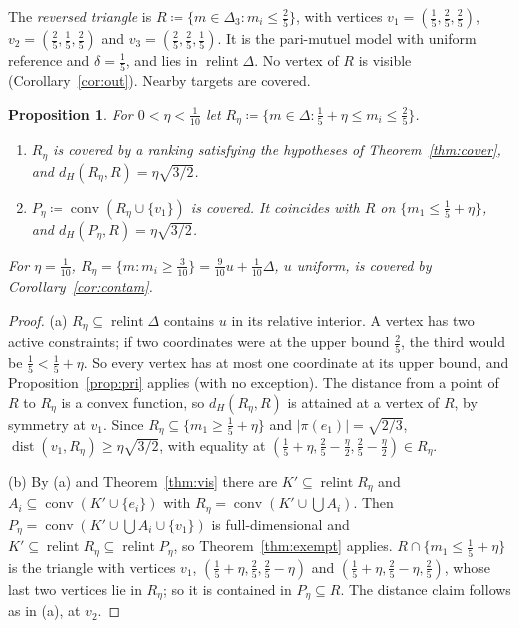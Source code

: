 \documentclass[11pt]{article}
\DeclareMathOperator{\conv}{conv}
\DeclareMathOperator{\relint}{relint}
\theoremstyle{plain}
\newtheorem{proposition}[theorem]{Proposition}
\theoremstyle{definition}
\theoremstyle{remark}
\begin{document}
The \emph{reversed triangle} is $R\coloneqq\{m\in\Delta_3:m_i\le\frac25\}$, with vertices
$v_1=(\frac15,\frac25,\frac25)$, $v_2=(\frac25,\frac15,\frac25)$ and
$v_3=(\frac25,\frac25,\frac15)$. It is the pari-mutuel model with uniform reference and
$\delta=\frac15$, and lies in $\relint\Delta$. No vertex of $R$ is visible
(Corollary~\ref{cor:out}). Nearby targets are covered.

\begin{proposition}\label{prop:trunc}
For $0<\eta<\frac1{10}$ let $R_\eta\coloneqq\{m\in\Delta:\frac15+\eta\le m_i\le\frac25\}$.
\begin{enumerate}[label=(\alph*)]
  \item $R_\eta$ is covered by a ranking satisfying the hypotheses of
  Theorem~\ref{thm:cover}, and $d_H(R_\eta,R)=\eta\sqrt{3/2}$.
  \item $P_\eta\coloneqq\conv(R_\eta\cup\{v_1\})$ is covered. It coincides with $R$ on
  $\{m_1\le\frac15+\eta\}$, and $d_H(P_\eta,R)=\eta\sqrt{3/2}$.
\end{enumerate}
For $\eta=\frac1{10}$, $R_\eta=\{m:m_i\ge\frac3{10}\}=\frac9{10}u+\frac1{10}\Delta$, $u$
uniform, is covered by Corollary~\ref{cor:contam}.
\end{proposition}

\begin{proof}
(a) $R_\eta\subseteq\relint\Delta$ contains $u$ in its relative interior. A vertex has two
active constraints; if two coordinates were at the upper bound $\frac25$, the third would
be $\frac15<\frac15+\eta$. So every vertex has at most one coordinate at its upper bound,
and Proposition~\ref{prop:pri} applies (with no exception). The distance from a point of
$R$ to $R_\eta$ is a convex function, so $d_H(R_\eta,R)$ is attained at a vertex of $R$,
by symmetry at $v_1$. Since $R_\eta\subseteq\{m_1\ge\frac15+\eta\}$ and $|\pi(e_1)|=
\sqrt{2/3}$, $\operatorname{dist}(v_1,R_\eta)\ge\eta\sqrt{3/2}$, with equality at
$(\frac15+\eta,\frac25-\frac\eta2,\frac25-\frac\eta2)\in R_\eta$.

(b) By (a) and Theorem~\ref{thm:vis} there are $K'\subseteq\relint R_\eta$ and
$A_i\subseteq\conv(K'\cup\{e_i\})$ with $R_\eta=\conv(K'\cup\bigcup A_i)$. Then
$P_\eta=\conv(K'\cup\bigcup A_i\cup\{v_1\})$ is full-dimensional and $K'\subseteq
\relint R_\eta\subseteq\relint P_\eta$, so Theorem~\ref{thm:exempt} applies.
$R\cap\{m_1\le\frac15+\eta\}$ is the triangle with vertices $v_1$,
$(\frac15+\eta,\frac25,\frac25-\eta)$ and $(\frac15+\eta,\frac25-\eta,\frac25)$, whose last
two vertices lie in $R_\eta$; so it is contained in $P_\eta\subseteq R$. The distance
claim follows as in (a), at $v_2$.
\end{proof}
\end{document}
